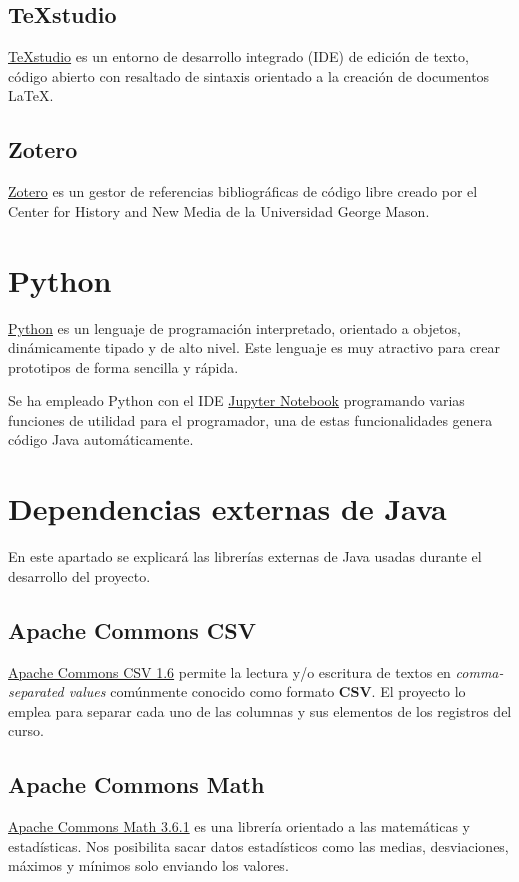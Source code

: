 \subsection{TeXstudio}

\href{https://www.texstudio.org/}{TeXstudio} es un entorno de desarrollo integrado (IDE) de edición de texto, código abierto con resaltado de sintaxis orientado a la creación de documentos \LaTeX.

\subsection{Zotero}
\href{https://www.zotero.org/}{Zotero} es un gestor de referencias bibliográficas de código libre creado por el Center for History and New Media de la Universidad George Mason.

\section{Python}
\href{https://www.python.org/}{Python} es un lenguaje de programación interpretado, orientado a objetos, dinámicamente tipado y de alto nivel. Este lenguaje es muy atractivo para crear prototipos de forma sencilla y rápida. 

Se ha empleado Python con el IDE \href{https://jupyter.org/}{Jupyter Notebook} programando varias funciones de utilidad para el programador, una de estas funcionalidades genera código Java automáticamente.

\section{Dependencias externas de Java}
En este apartado se explicará las librerías externas de Java usadas durante el desarrollo del proyecto. 

\subsection{Apache Commons CSV}
\href{https://commons.apache.org/proper/commons-csv/
}{Apache Commons CSV 1.6} permite la lectura y/o escritura de textos en \textit{comma-separated values} comúnmente conocido como formato \textbf{CSV}. 
El proyecto lo emplea para separar cada uno de las columnas y sus elementos de los registros del curso.

\subsection{Apache Commons Math}
\href{https://commons.apache.org/proper/commons-math/}{Apache Commons Math
3.6.1} es una librería orientado a las matemáticas y estadísticas.
Nos posibilita sacar datos estadísticos como las medias, desviaciones, máximos y mínimos solo enviando los valores.


